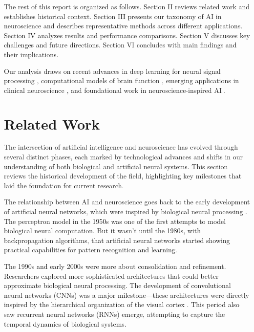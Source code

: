 \documentclass[conference]{IEEEtran}
\begin{document}
The rest of this report is organized as follows. Section II reviews related work and establishes historical context. Section III presents our taxonomy of AI in neuroscience and describes representative methods across different applications. Section IV analyzes results and performance comparisons. Section V discusses key challenges and future directions. Section VI concludes with main findings and their implications.

Our analysis draws on recent advances in deep learning for neural signal processing \citep{lawhernEEGNetCompactConvolutional2018}, computational models of brain function \citep{gucluDeepNeuralNetworks2015}, emerging applications in clinical neuroscience \citep{hechkelEarlyDetectionClassification2025}, and foundational work in neuroscience-inspired AI \citep{hassabisNeuroscienceinspiredArtificialIntelligence2017}.

\section{Related Work}

The intersection of artificial intelligence and neuroscience has evolved through several distinct phases, each marked by technological advances and shifts in our understanding of both biological and artificial neural systems. This section reviews the historical development of the field, highlighting key milestones that laid the foundation for current research.

The relationship between AI and neuroscience goes back to the early development of artificial neural networks, which were inspired by biological neural processing \citep{LeCun:2015pmr}. The perceptron model in the 1950s was one of the first attempts to model biological neural computation. But it wasn't until the 1980s, with backpropagation algorithms, that artificial neural networks started showing practical capabilities for pattern recognition and learning.

The 1990s and early 2000s were more about consolidation and refinement. Researchers explored more sophisticated architectures that could better approximate biological neural processing. The development of convolutional neural networks (CNNs) was a major milestone—these architectures were directly inspired by the hierarchical organization of the visual cortex \citep{gucluDeepNeuralNetworks2015}. This period also saw recurrent neural networks (RNNs) emerge, attempting to capture the temporal dynamics of biological systems.
\end{document}
